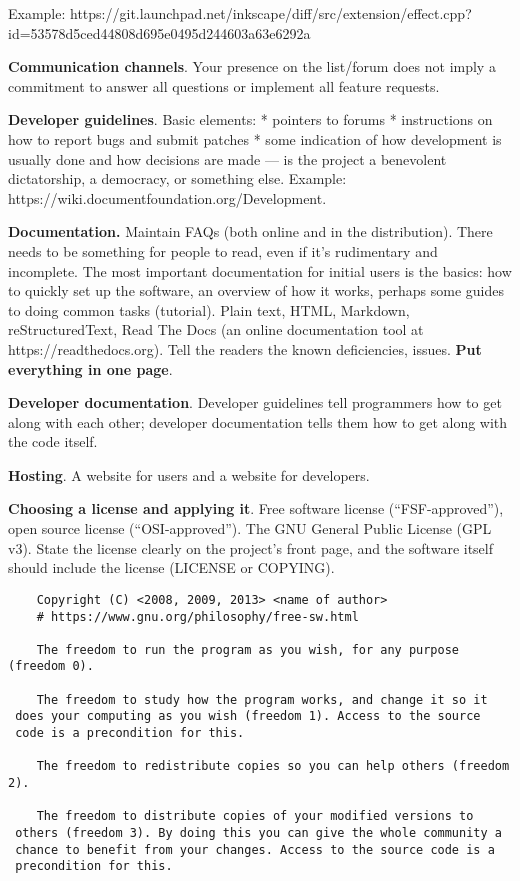 \documentclass[landscape,30pt]{foils}
\begin{document}
Example: https://git.launchpad.net/inkscape/diff/src/extension/effect.cpp?id=53578d5ced44808d695e0495d244603a63e6292a

{\bf Communication channels}.  Your presence on the list/forum does not imply a commitment to answer all questions or implement all feature requests.

{\bf Developer guidelines}. Basic elements: *  pointers to forums  * instructions on how to report bugs and submit patches  *  some indication of how development is usually done and how decisions are made — is the project a
benevolent dictatorship, a democracy, or something else.  Example: https://wiki.documentfoundation.org/Development.

{\bf Documentation.}  Maintain FAQs (both online and in the
distribution). There needs to be something for people to read, even if
it's rudimentary and incomplete. The most important documentation for
initial users is the basics: how to quickly set up the software, an
overview of how it works, perhaps some guides to doing common tasks
(tutorial).  Plain text, HTML, Markdown, reStructuredText, Read The
Docs (an online documentation tool at https://readthedocs.org).  Tell the readers the known
deficiencies, issues.  {\bf Put everything in one page}.

{\bf Developer documentation}.  Developer guidelines tell programmers how to get along with each
other; developer documentation tells them how to get along with the code itself. 

{\bf Hosting}. A website for users and a website for developers.

{\bf Choosing a license and applying it}. Free software license
(``FSF-approved''), open source license (``OSI-approved'').  The GNU General Public License (GPL v3).   State the license clearly on the project's front page, and the software itself should include the license (LICENSE or COPYING).


{\tiny
\begin{verbatim}
    Copyright (C) <2008, 2009, 2013> <name of author>
    # https://www.gnu.org/philosophy/free-sw.html

    The freedom to run the program as you wish, for any purpose (freedom 0).

    The freedom to study how the program works, and change it so it
 does your computing as you wish (freedom 1). Access to the source
 code is a precondition for this.

    The freedom to redistribute copies so you can help others (freedom 2).
    
    The freedom to distribute copies of your modified versions to
 others (freedom 3). By doing this you can give the whole community a
 chance to benefit from your changes. Access to the source code is a
 precondition for this.

\end{verbatim}
}
\end{document}

